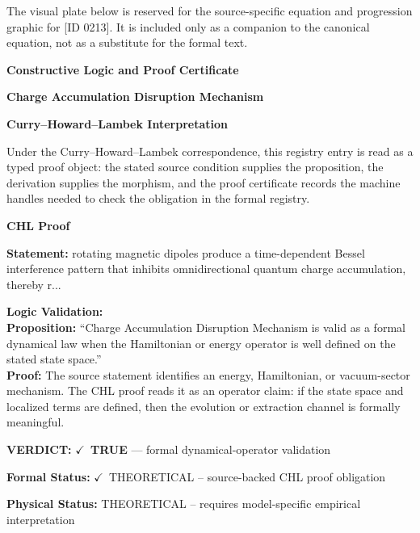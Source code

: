\begingroup\footnotesize\sloppy
The visual plate below is reserved for the source-specific equation and progression graphic for [ID 0213]. It is included only as a companion to the canonical equation, not as a substitute for the formal text.
\par\endgroup
\ifTZPDarkEdition
{}
\fi

\clearpage
\begingroup\tzpsupportsetup
\noindent\textbf{\fontsize{10.8pt}{12.8pt}\selectfont [ID 0213] Constructive Logic and Proof Certificate}\par
\noindent\textbf{\fontsize{10pt}{12pt}\selectfont Charge Accumulation Disruption Mechanism}\par
\vspace{0.45em}
\begingroup
\footnotesize
\setlength{\parskip}{0.22em}
\setlength{\parindent}{0pt}
\noindent\textbf{Curry--Howard--Lambek Interpretation}\par
Under the Curry--Howard--Lambek correspondence, this registry entry is read as a typed proof
object: the stated source condition supplies the proposition, the derivation supplies the
morphism, and the proof certificate records the machine handles needed to check the obligation
in the formal registry.

\vspace{0.45em}
\noindent\textbf{CHL Proof}\par
\textbf{Statement:} rotating magnetic dipoles produce a time-dependent Bessel interference pattern that
inhibits omnidirectional quantum charge accumulation, thereby r...

\textbf{Logic Validation:}\\
\textbf{Proposition:} ``Charge Accumulation Disruption Mechanism is valid as a formal dynamical law when the
Hamiltonian or energy operator is well defined on the stated state space.''\\
\textbf{Proof:} The source statement identifies an energy, Hamiltonian, or vacuum-sector mechanism. The
CHL proof reads it as an operator claim: if the state space and localized terms are
defined, then the evolution or extraction channel is formally meaningful.

\textbf{VERDICT:} \ensuremath{\checkmark}\ \textbf{TRUE} --- formal dynamical-operator validation

\textbf{Formal Status:} \ensuremath{\checkmark}\ THEORETICAL -- source-backed CHL proof obligation

\textbf{Physical Status:} THEORETICAL -- requires model-specific empirical interpretation
\par\vspace{0.45em}
\par
\ifTZPDarkEdition
{}
\fi
\endgroup
\endgroup
